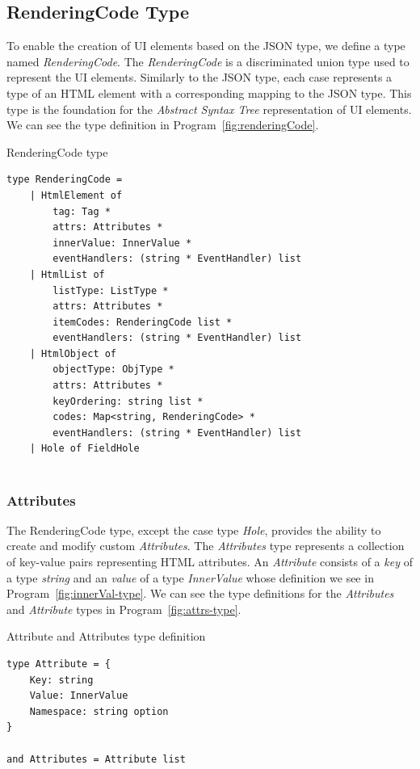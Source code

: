 \subsection{RenderingCode Type}
To enable the creation of UI elements based on the JSON type, we define a type named \emph{RenderingCode}.
The \emph{RenderingCode} is a discriminated union type used to represent the UI elements.
Similarly to the JSON type, each case represents a type of an HTML element with a corresponding mapping to the JSON type.
This type is the foundation for the \emph{Abstract Syntax Tree} representation of UI elements.
We can see the type definition in Program~\ref{fig:renderingCode}.
\begin{listing}[htbp]
	\caption {RenderingCode type}
	\label{fig:renderingCode}
	\begin{lstlisting}
type RenderingCode =
    | HtmlElement of 
        tag: Tag * 
        attrs: Attributes * 
        innerValue: InnerValue * 
        eventHandlers: (string * EventHandler) list
    | HtmlList of
        listType: ListType *
        attrs: Attributes *
        itemCodes: RenderingCode list *
        eventHandlers: (string * EventHandler) list
    | HtmlObject of
        objectType: ObjType *
        attrs: Attributes *
        keyOrdering: string list *
        codes: Map<string, RenderingCode> *
        eventHandlers: (string * EventHandler) list
    | Hole of FieldHole
 
  \end{lstlisting}
\end{listing}

\subsubsection{Attributes}
The RenderingCode type, except the case type \emph{Hole}, provides the ability to create and modify custom \emph{Attributes}.
The \emph{Attributes} type represents a collection of key-value pairs representing HTML attributes.
An \emph{Attribute} consists of a \emph{key} of a type \emph{string} and an \emph{value} of a type \emph{InnerValue} whose definition we see in Program~\ref{fig:innerVal-type}.
We can see the type definitions for the \emph{Attributes} and \emph{Attribute} types in Program~\ref{fig:attrs-type}.
\begin{listing}[H]
	\caption{Attribute and Attributes type definition}
	\label{fig:attrs-type}
	\begin{lstlisting}
type Attribute = {
    Key: string
    Value: InnerValue
    Namespace: string option
}

and Attributes = Attribute list
    \end{lstlisting}
\end{listing}

